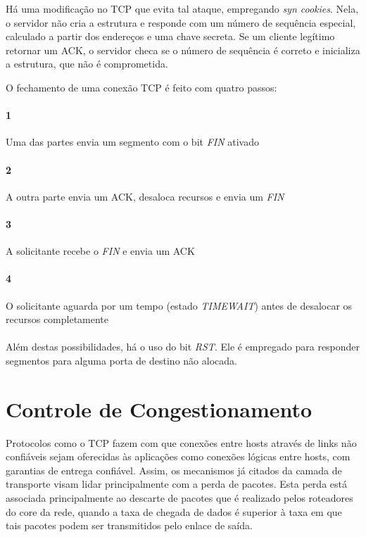 Há uma modificação no TCP que evita tal ataque, empregando \emph{syn cookies}.
Nela, o servidor não cria a estrutura e responde com um número de sequência especial, calculado a partir dos endereços e uma chave secreta.
Se um cliente legítimo retornar um ACK, o servidor checa se o número de sequência é correto e inicializa a estrutura, que não é comprometida.

O fechamento de uma conexão TCP é feito com quatro passos:
\paragraph{1} Uma das partes envia um segmento com o bit \emph{FIN} ativado
\paragraph{2} A outra parte envia um ACK, desaloca recursos e envia um \emph{FIN}
\paragraph{3} A solicitante recebe o \emph{FIN} e envia um ACK
\paragraph{4} O solicitante aguarda por um tempo (estado \emph{TIMEWAIT}) antes de desalocar os recursos completamente

\paragraph{} Além destas possibilidades, há o uso do bit \emph{RST}. 
Ele é empregado para responder segmentos para alguma porta de destino não alocada.

\section{Controle de Congestionamento}

Protocolos como o TCP fazem com que conexões entre hosts através de links não confiáveis sejam oferecidas às aplicações como conexões lógicas entre hosts, com garantias de entrega confiável.
Assim, os mecanismos já citados da camada de transporte visam lidar principalmente com a perda de pacotes.
Esta perda está associada principalmente ao descarte de pacotes que é realizado pelos roteadores do core da rede, quando a taxa de chegada de dados é superior à taxa em que tais pacotes podem ser transmitidos pelo enlace de saída.

